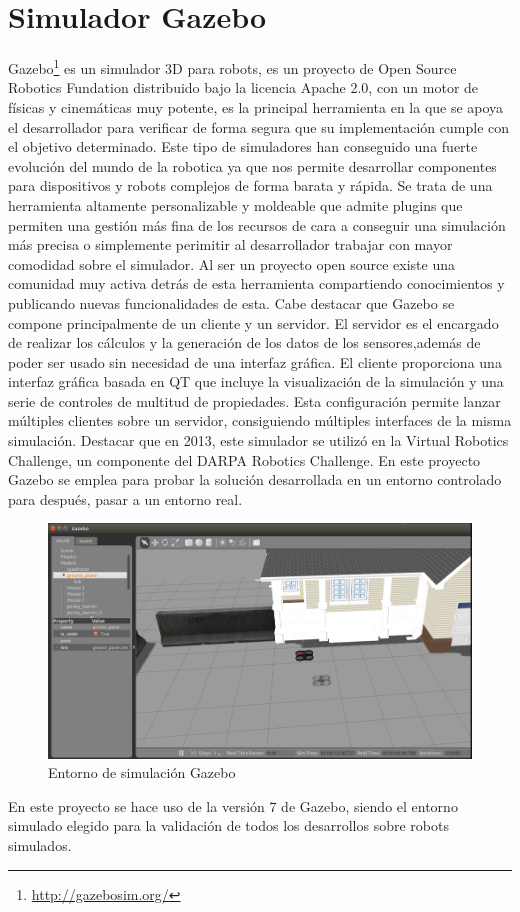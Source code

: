 \section{Simulador Gazebo}
\label{sec:gazebo}
Gazebo\footnote{\url{http://gazebosim.org/}} es un simulador 3D para robots, es un proyecto de Open Source Robotics Fundation distribuido bajo la licencia Apache 2.0, con un motor de físicas y cinemáticas muy potente, es la principal herramienta en la que se apoya el desarrollador para verificar de forma segura que su implementación cumple con el objetivo determinado. Este tipo de simuladores han conseguido una fuerte evolución del mundo de la robotica ya que nos permite desarrollar componentes para dispositivos y robots complejos de forma barata y rápida.
Se trata de una herramienta altamente personalizable y moldeable que admite plugins que permiten una gestión más fina de los recursos de cara a conseguir una simulación más precisa o simplemente perimitir al desarrollador trabajar con mayor comodidad sobre el simulador.
Al ser un proyecto open source existe una comunidad muy activa detrás de esta herramienta compartiendo conocimientos y publicando nuevas funcionalidades de esta.
Cabe destacar que Gazebo se compone principalmente de un cliente y un servidor. El
servidor es el encargado de realizar los cálculos y la generación de los datos de los sensores,además de poder ser usado sin necesidad de una interfaz gráfica.
El cliente proporciona una interfaz gráfica basada en QT que incluye la visualización de la simulación y una serie de controles de multitud de propiedades. Esta configuración permite lanzar múltiples clientes sobre un servidor, consiguiendo múltiples interfaces de la misma simulación.
Destacar que en 2013, este simulador se utilizó en la Virtual Robotics Challenge, un componente del DARPA Robotics Challenge.
En este proyecto Gazebo se emplea para probar la solución desarrollada en un entorno controlado para después, pasar a un entorno real. \\

\begin{figure}[H]
    \centering
    \includegraphics[scale=0.50]{img/gazebo.PNG}
  	\caption{Entorno de simulación Gazebo}
  	\label{fig:gazebo}
\end{figure}

En este proyecto se hace uso de la versión 7 de Gazebo, siendo el entorno simulado elegido para la validación de todos los desarrollos sobre robots simulados.